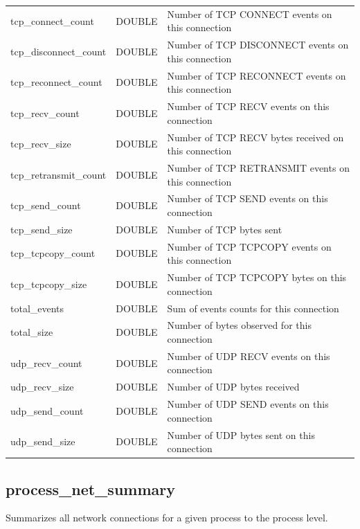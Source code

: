 \documentclass[conference,compsoc]{IEEEtran}
\begin{document}
\begin{longtable}{|p{5cm}|p{2cm}|p{9cm}|}
tcp\_connect\_count & DOUBLE & Number of TCP CONNECT events on this connection \\
tcp\_disconnect\_count & DOUBLE & Number of TCP DISCONNECT events on this connection \\
tcp\_reconnect\_count & DOUBLE & Number of TCP RECONNECT events on this connection \\
tcp\_recv\_count & DOUBLE & Number of TCP RECV events on this connection \\
tcp\_recv\_size & DOUBLE & Number of TCP RECV bytes received on this connection \\
tcp\_retransmit\_count & DOUBLE & Number of TCP RETRANSMIT events on this connection \\
tcp\_send\_count & DOUBLE & Number of TCP SEND events on this connection \\
tcp\_send\_size & DOUBLE & Number of TCP bytes sent \\
tcp\_tcpcopy\_count & DOUBLE & Number of TCP TCPCOPY events on this connection \\
tcp\_tcpcopy\_size & DOUBLE & Number of TCP TCPCOPY bytes on this connection \\
total\_events & DOUBLE & Sum of events counts for this connection \\
total\_size & DOUBLE & Number of bytes observed for this connection \\
udp\_recv\_count & DOUBLE & Number of UDP RECV events on this connection \\
udp\_recv\_size & DOUBLE & Number of UDP bytes received \\
udp\_send\_count & DOUBLE & Number of UDP SEND events on this connection \\
udp\_send\_size & DOUBLE & Number of UDP bytes sent on this connection \\
\hline
\end{longtable}

\subsection{process\_net\_summary}
\label{sec:process_net_summary}

Summarizes all network connections for a given process to the process level.
\end{document}

